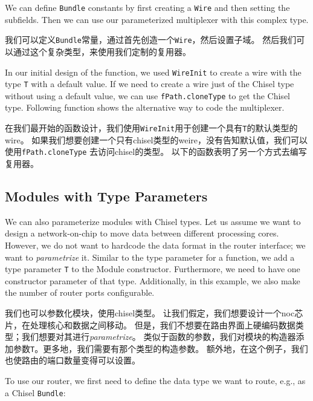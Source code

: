\documentclass[%
    10pt,
    headinclude, footexclude,
    openright, %
    notitlepage,
    cleardoubleempty,
    headsepline,
    pointlessnumbers,
    bibtotoc, idxtotoc,
    ]{scrbook}
\newcommand{\code}[1]{{\small{\texttt{#1}}}}
\begin{document}

\noindent We can define \code{Bundle} constants by first creating
a \code{Wire} and then setting the subfields.
Then we can use our parameterized multiplexer with this complex type.

\noindent 我们可以定义\code{Bundle}常量，通过首先创造一个\code{Wire}，然后设置子域。
然后我们可以通过这个复杂类型，来使用我们定制的复用器。


In our initial design of the function, we used \code{WireInit}
to create a wire with the type \code{T} with a default value.
If we need to create a wire just of the Chisel type without using a default
value, we can use \code{fPath.cloneType} to get the Chisel type.
Following function shows the alternative way to code the multiplexer.

在我们最开始的函数设计，我们使用\code{WireInit}用于创建一个具有\code{T}的默认类型的wire。
如果我们想要创建一个只有chisel类型的weire，没有告知默认值，我们可以使用\code{fPath.cloneType}
去访问chisel的类型。
以下的函数表明了另一个方式去编写复用器。


\subsection{Modules with Type Parameters}

We can also parameterize modules with Chisel types.
Let us assume we want to design a network-on-chip to move data between
different processing cores. However, we do not want to hardcode the
data format in the router interface; we want to \emph{parametrize} it.
Similar to the type parameter for a function, we add a type parameter \code{T}
to the Module constructor. Furthermore, we need to have one constructor
parameter of that type. Additionally, in this example, we also make the number
of router ports configurable.

我们也可以参数化模块，使用chisel类型。
让我们假定，我们想要设计一个noc芯片，在处理核心和数据之间移动。
但是，我们不想要在路由界面上硬编码数据类型；我们想要对其进行\emph{parametrize}。
类似于函数的参数，我们对模块的构造器添加参数\code{T}。更多地，我们需要有那个类型的构造参数。
额外地，在这个例子，我们也使路由的端口数量变得可以设置。


\noindent To use our router, we first need to define the data type we want to route, e.g.,
as a Chisel \code{Bundle}:
\end{document}
